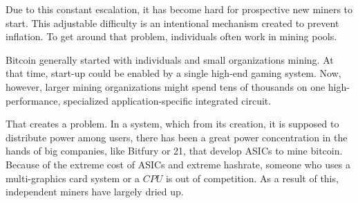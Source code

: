 Due to this constant escalation, it has become hard for prospective new miners to start. This adjustable difficulty is an intentional mechanism created to prevent inflation. To get around that problem, individuals often work in mining pools.

Bitcoin generally started with individuals and small organizations mining. At that time, start-up could be enabled by a single high-end gaming system. Now, however, larger mining organizations might spend tens of thousands on one high-performance, specialized application-specific integrated circuit.

That creates a problem. In a system, which from its creation, it is supposed to distribute power among users, there has been a great power concentration in the hands of big companies, like Bitfury or 21, that develop ASICs to mine bitcoin. Because of the extreme cost of ASICs and extreme hashrate, someone who uses a multi-graphics card system or a $CPU$ is out of competition. As a result of this, independent miners have largely dried up.

%
%
%

